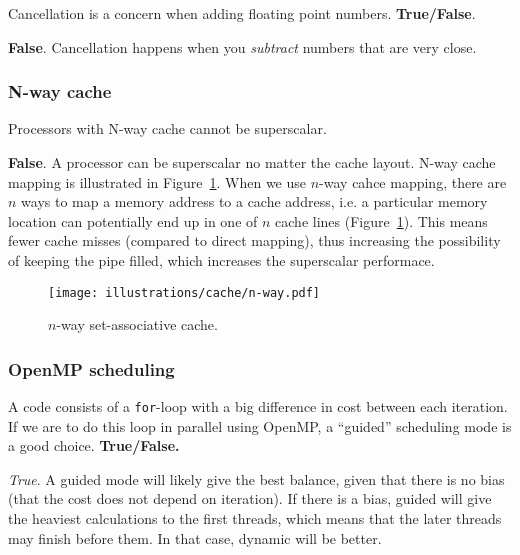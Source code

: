 \begin{question}
  Cancellation is a concern when adding floating point numbers. \textbf{True/False}.
\end{question}

\textbf{False}. Cancellation happens when you \emph{subtract} numbers that are very close.

\subsubsection{N-way cache} %
\label{ssub:n_way_cache}

\begin{question}
  Processors with N-way cache cannot be superscalar.
\end{question}
\textbf{False}. A processor can be superscalar no matter the cache layout. N-way cache mapping is illustrated in Figure~\ref{fig:nway}. When we use $n$-way cahce mapping, there are $n$ ways to map a memory address to a cache address, i.e. a particular memory location can potentially end up in one of $n$ cache lines (Figure~\ref{fig:nway}). This means fewer cache misses (compared to direct mapping), thus increasing the possibility of keeping the pipe filled, which increases the superscalar performace.

\begin{figure}[htbp]
  \centering
  \texttt{[image: illustrations/cache/n-way.pdf]}
  \caption{$n$-way set-associative cache.}
  \label{fig:nway}
\end{figure}

\subsubsection{OpenMP scheduling} %
\label{ssub:openmp_scheduling}

\begin{question}
  A code consists of a \texttt{for}-loop with a big difference in cost between each iteration. If we are to do this loop in parallel using OpenMP, a ``guided'' scheduling mode is a good choice. \textbf{True/False.}
\end{question}

\emph{True}. A guided mode will likely give the best balance, given that there is no bias (that the cost does not depend on iteration). If there is a bias, guided will give the heaviest calculations to the first threads, which means that the later threads may finish before them. In that case, dynamic will be better.

